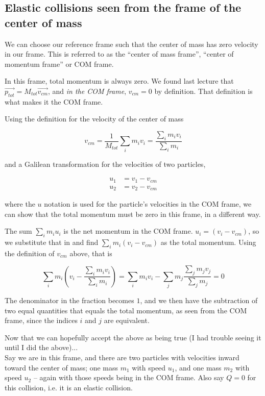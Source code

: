 \subsection{Elastic collisions seen from the frame of the center of mass}

We can choose our reference frame such that the center of mass has zero velocity in our frame. This is referred to as the ``center of mass frame'', ``center of momentum frame'' or COM frame.

In this frame, total momentum is always zero. We found last lecture that $\vec{p_{tot}} = M_{tot} \vec{v_{cm}}$, and \emph{in the COM frame}, $v_{cm} = 0$ by definition. That definition is what makes it the COM frame.

Using the definition for the velocity of the center of mass

\begin{equation}
v_{cm} = \frac{1}{M_{tot}} \sum_i m_i v_i = \frac{\sum_i m_i v_i}{\sum_i m_i}
\end{equation}

and a Galilean transformation for the velocities of two particles,

\begin{align}
u_1 &= v_1 - v_{cm}\\
u_2 &= v_2 - v_{cm}
\end{align}

where the $u$ notation is used for the particle's velocities in the COM frame, we can show that the total momentum must be zero in this frame, in a different way.

The sum $\sum_i m_i u_i$ is the net momentum in the COM frame. $u_i = (v_i - v_{cm})$, so we substitute that in and find $\sum_i m_i (v_i - v_{cm})$ as the total momentum. Using the definition of $v_{cm}$ above, that is

\begin{equation}
\sum_i m_i \left(v_i - \frac{\sum_i m_i v_i}{\sum_i m_i}\right) = \sum_i m_i v_i - \sum_j m_j \frac{\sum_j m_j v_j}{\sum_j m_j} = 0
\end{equation}

The denominator in the fraction becomes $1$, and we then have the subtraction of two equal quantities that equals the total momentum, as seen from the COM frame, since the indices $i$ and $j$ are equivalent.

Now that we can hopefully accept the above as being true (I had trouble seeing it until I did the above)...\\
Say we are in this frame, and there are two particles with velocities inward toward the center of mass; one mass $m_1$ with speed $u_1$, and one mass $m_2$ with speed $u_2$ -- again with those speeds being in the COM frame. Also say $Q = 0$ for this collision, i.e. it is an elastic collision.


